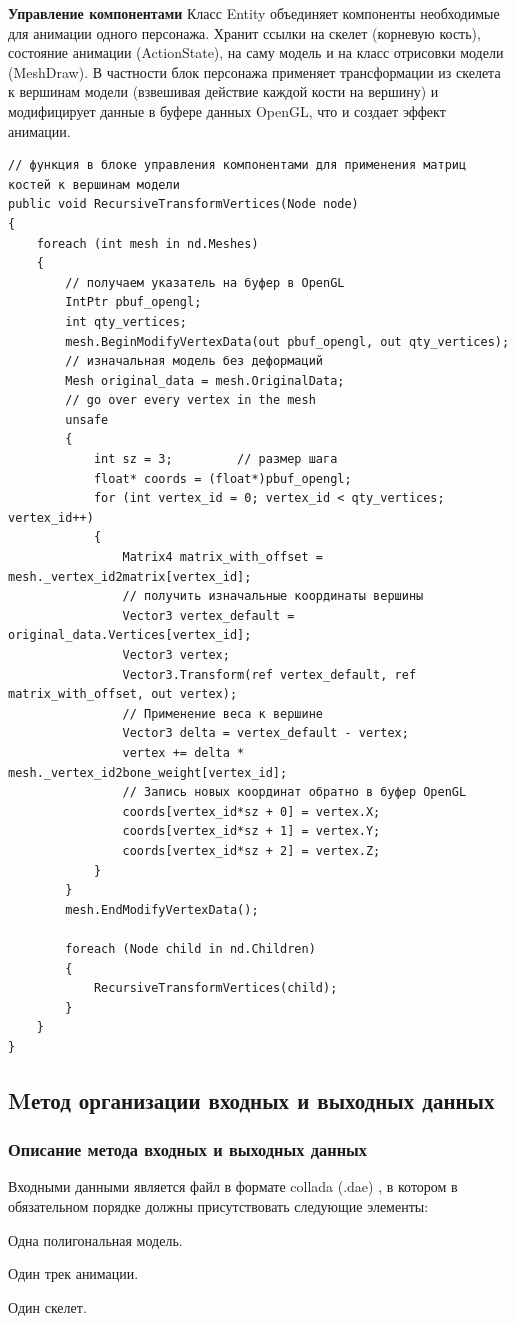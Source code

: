 \textbf{Управление компонентами}
Класс Entity объединяет компоненты необходимые для анимации одного персонажа. Хранит ссылки на скелет (корневую кость), состояние анимации (ActionState), на саму модель и на класс отрисовки модели (MeshDraw).
    \medskip
    В частности блок персонажа применяет трансформации из скелета к вершинам модели (взвешивая действие каждой кости на вершину) и модифицирует данные в буфере данных OpenGL, что и создает эффект анимации.
    
\begin{verbatim}
// функция в блоке управления компонентами для применения матриц костей к вершинам модели
public void RecursiveTransformVertices(Node node)
{
    foreach (int mesh in nd.Meshes)
    {
        // получаем указатель на буфер в OpenGL
        IntPtr pbuf_opengl;
        int qty_vertices;
        mesh.BeginModifyVertexData(out pbuf_opengl, out qty_vertices);
        // изначальная модель без деформаций
        Mesh original_data = mesh.OriginalData;
        // go over every vertex in the mesh
        unsafe
        {
            int sz = 3;         // размер шага
            float* coords = (float*)pbuf_opengl;
            for (int vertex_id = 0; vertex_id < qty_vertices; vertex_id++)
            {
                Matrix4 matrix_with_offset = mesh._vertex_id2matrix[vertex_id];
                // получить изначальные координаты вершины
                Vector3 vertex_default = original_data.Vertices[vertex_id];
                Vector3 vertex;
                Vector3.Transform(ref vertex_default, ref matrix_with_offset, out vertex);
                // Применение веса к вершине
                Vector3 delta = vertex_default - vertex;
                vertex += delta *  mesh._vertex_id2bone_weight[vertex_id];
                // Запись новых координат обратно в буфер OpenGL
                coords[vertex_id*sz + 0] = vertex.X;
                coords[vertex_id*sz + 1] = vertex.Y;
                coords[vertex_id*sz + 2] = vertex.Z;
            }
        }
        mesh.EndModifyVertexData();

        foreach (Node child in nd.Children)
        {
            RecursiveTransformVertices(child);
        }
    }
}
\end{verbatim}


\subsection{Mетод организации входных и выходных данных}

\subsubsection{Описание метода входных и выходных данных}
Входными данными является файл в формате collada (.dae)
, в котором в обязательном порядке должны присутствовать следующие элементы:
\begin{my_enumerate}
\item Одна полигональная модель.
\item Один трек анимации.
\item Один скелет.
\end{my_enumerate}

